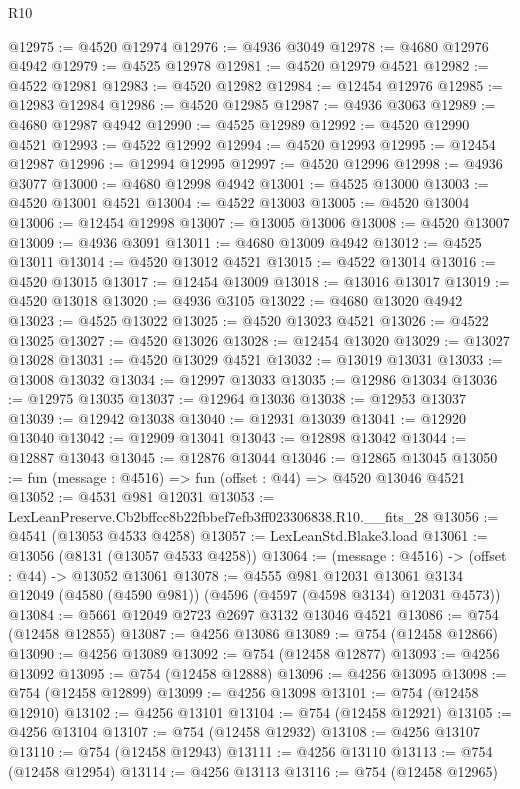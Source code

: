 \begin{lexlean}{R10}
\begin{coremodule}
@12975 := @4520 @12974
@12976 := @4936 @3049
@12978 := @4680 @12976 @4942
@12979 := @4525 @12978
@12981 := @4520 @12979 @4521
@12982 := @4522 @12981
@12983 := @4520 @12982
@12984 := @12454 @12976
@12985 := @12983 @12984
@12986 := @4520 @12985
@12987 := @4936 @3063
@12989 := @4680 @12987 @4942
@12990 := @4525 @12989
@12992 := @4520 @12990 @4521
@12993 := @4522 @12992
@12994 := @4520 @12993
@12995 := @12454 @12987
@12996 := @12994 @12995
@12997 := @4520 @12996
@12998 := @4936 @3077
@13000 := @4680 @12998 @4942
@13001 := @4525 @13000
@13003 := @4520 @13001 @4521
@13004 := @4522 @13003
@13005 := @4520 @13004
@13006 := @12454 @12998
@13007 := @13005 @13006
@13008 := @4520 @13007
@13009 := @4936 @3091
@13011 := @4680 @13009 @4942
@13012 := @4525 @13011
@13014 := @4520 @13012 @4521
@13015 := @4522 @13014
@13016 := @4520 @13015
@13017 := @12454 @13009
@13018 := @13016 @13017
@13019 := @4520 @13018
@13020 := @4936 @3105
@13022 := @4680 @13020 @4942
@13023 := @4525 @13022
@13025 := @4520 @13023 @4521
@13026 := @4522 @13025
@13027 := @4520 @13026
@13028 := @12454 @13020
@13029 := @13027 @13028
@13031 := @4520 @13029 @4521
@13032 := @13019 @13031
@13033 := @13008 @13032
@13034 := @12997 @13033
@13035 := @12986 @13034
@13036 := @12975 @13035
@13037 := @12964 @13036
@13038 := @12953 @13037
@13039 := @12942 @13038
@13040 := @12931 @13039
@13041 := @12920 @13040
@13042 := @12909 @13041
@13043 := @12898 @13042
@13044 := @12887 @13043
@13045 := @12876 @13044
@13046 := @12865 @13045
@13050 := fun (message : @4516) => fun (offset : @44) => @4520 @13046 @4521
@13052 := @4531 @981 @12031
@13053 := LexLeanPreserve.Cb2bffcc8b22fbbef7efb3ff023306838.R10.__fits_28
@13056 := @4541 (@13053 @4533 @4258)
@13057 := LexLeanStd.Blake3.load
@13061 := @13056 (@8131 (@13057 @4533 @4258))
@13064 := (message : @4516) -> (offset : @44) -> @13052 @13061
@13078 := @4555
    @981
    @12031
    @13061
    @3134
    @12049
    (@4580 (@4590 @981))
    (@4596 (@4597 (@4598 @3134) @12031 @4573))
@13084 := @5661 @12049 @2723 @2697 @3132 @13046 @4521
@13086 := @754 (@12458 @12855)
@13087 := @4256 @13086
@13089 := @754 (@12458 @12866)
@13090 := @4256 @13089
@13092 := @754 (@12458 @12877)
@13093 := @4256 @13092
@13095 := @754 (@12458 @12888)
@13096 := @4256 @13095
@13098 := @754 (@12458 @12899)
@13099 := @4256 @13098
@13101 := @754 (@12458 @12910)
@13102 := @4256 @13101
@13104 := @754 (@12458 @12921)
@13105 := @4256 @13104
@13107 := @754 (@12458 @12932)
@13108 := @4256 @13107
@13110 := @754 (@12458 @12943)
@13111 := @4256 @13110
@13113 := @754 (@12458 @12954)
@13114 := @4256 @13113
@13116 := @754 (@12458 @12965)

\end{coremodule}
\end{lexlean}
